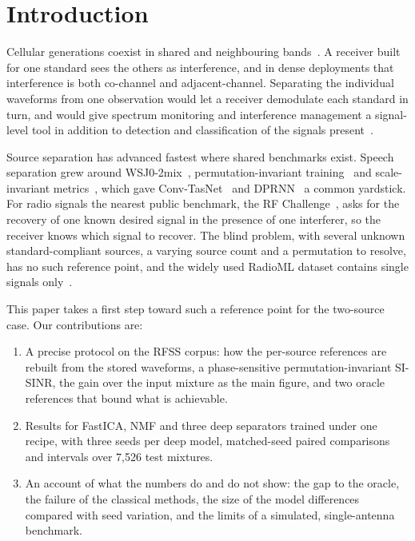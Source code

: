 \documentclass[conference]{IEEEtran}
\begin{document}
\section{Introduction}

Cellular generations coexist in shared and neighbouring bands~\cite{cabric2004implementation,andrews2014what}.
A receiver built for one standard sees the others as interference, and in dense deployments
that interference is both co-channel and adjacent-channel. Separating the individual waveforms
from one observation would let a receiver demodulate each standard in turn, and would give
spectrum monitoring and interference management a signal-level tool in addition to detection and
classification of the signals present~\cite{rajendran2018deep}.

Source separation has advanced fastest where shared benchmarks exist. Speech separation grew around
WSJ0-2mix~\cite{hershey2016deep}, permutation-invariant training~\cite{kolbaek2017multitalker}
and scale-invariant metrics~\cite{leroux2019sdr}, which gave Conv-TasNet~\cite{luo2019conv} and
DPRNN~\cite{luo2020dual} a common yardstick. For radio signals the nearest public benchmark, the
RF Challenge~\cite{lancho2024rfchallenge}, asks for the recovery of one known desired signal in the presence of one
interferer, so the receiver knows which signal to recover. The blind problem, with several unknown
standard-compliant sources, a varying source count and a permutation to resolve, has no such reference
point, and the widely used RadioML dataset contains single signals only~\cite{oshea2016radio}.

This paper takes a first step toward such a reference point for the two-source case. Our contributions are:
\begin{enumerate}
  \item A precise protocol on the RFSS corpus: how the per-source references are rebuilt from
    the stored waveforms, a phase-sensitive permutation-invariant SI-SINR, the gain over the input mixture as the main
    figure, and two oracle references that bound what is achievable.
  \item Results for FastICA, NMF and three deep separators trained under one recipe, with three seeds
    per deep model, matched-seed paired comparisons and intervals over 7,526 test mixtures.
  \item An account of what the numbers do and do not show: the gap to the oracle, the failure of the
    classical methods, the size of the model differences compared with seed variation, and the limits of a
    simulated, single-antenna benchmark.
\end{enumerate}
\end{document}
